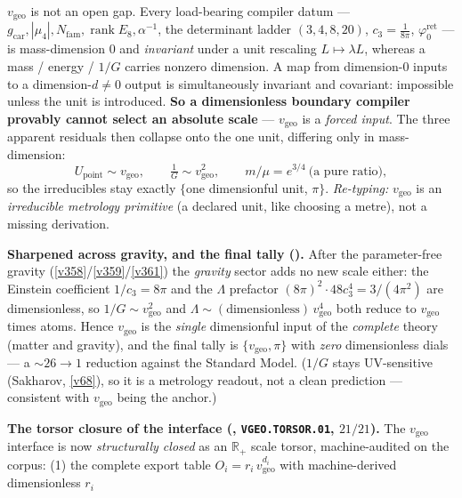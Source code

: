 \documentclass[11pt,a4paper]{article}
\newcommand{\phiz}{\varphi_0^{\mathrm{ret}}}
\newcommand{\cthree}{c_3}
\newcommand{\Nfam}{N_{\mathrm{fam}}}
\newcommand{\gcar}{g_{\mathrm{car}}}
\begin{document}
\begin{keybox}
$v_{\mathrm{geo}}$ is not an open gap. Every load-bearing compiler datum --- $\gcar,|\mu_4|,\Nfam,\operatorname{rank}E_8,
\alpha^{-1}$, the determinant ladder $(3,4,8,20)$, $\cthree=\tfrac1{8\pi}$, $\phiz$ --- is mass-dimension $0$ and
\emph{invariant} under a unit rescaling $L\mapsto\lambda L$, whereas a mass / energy / $1/G$ carries nonzero
dimension. A map from dimension-$0$ inputs to a dimension-$d{\neq}0$ output is simultaneously invariant and
covariant: impossible unless the unit is introduced. \textbf{So a dimensionless boundary compiler provably
cannot select an absolute scale} --- $v_{\mathrm{geo}}$ is a \emph{forced input}. The three apparent residuals
then collapse onto the one unit, differing only in mass-dimension:
\[
  U_{\mathrm{point}}\sim v_{\mathrm{geo}},\qquad \tfrac1G\sim v_{\mathrm{geo}}^2,\qquad m/\mu=e^{3/4}\ \text{(a pure ratio)},
\]
so the irreducibles stay exactly $\{$one dimensionful unit, $\pi\}$. \emph{Re-typing:} $v_{\mathrm{geo}}$ is an
\emph{irreducible metrology primitive} (a declared unit, like choosing a metre), not a missing derivation.
\par\smallskip\noindent\textbf{Sharpened across gravity, and the final tally ().} After the
parameter-free gravity (\vref{v358}/\vref{v359}/\vref{v361}) the \emph{gravity} sector adds no new scale either: the
Einstein coefficient $1/\cthree=8\pi$ and the $\Lambda$ prefactor $(8\pi)^2\!\cdot\!48\cthree^4=3/(4\pi^2)$ are
dimensionless, so $1/G\sim v_{\mathrm{geo}}^2$ and $\Lambda\sim(\text{dimensionless})\,v_{\mathrm{geo}}^4$ both reduce
to $v_{\mathrm{geo}}$ times atoms. Hence $v_{\mathrm{geo}}$ is the \emph{single} dimensionful input of the
\emph{complete} theory (matter and gravity), and the final tally is $\{v_{\mathrm{geo}},\pi\}$ with \emph{zero}
dimensionless dials --- a ${\sim}26\to1$ reduction against the Standard Model. ($1/G$ stays UV-sensitive (Sakharov,
\vref{v68}), so it is a metrology readout, not a clean prediction --- consistent with $v_{\mathrm{geo}}$ being the
anchor.)
\par\smallskip\noindent\textbf{The torsor closure of the interface
(, \texttt{VGEO.TORSOR.01},
$21/21$).} The $v_{\mathrm{geo}}$ interface is now \emph{structurally
closed} as an $\mathbb R_+$ scale torsor, machine-audited on the
corpus: (1) the complete export table $O_i=r_i\,
v_{\mathrm{geo}}^{d_i}$ with machine-derived dimensionless $r_i$

\end{keybox}
\end{document}
